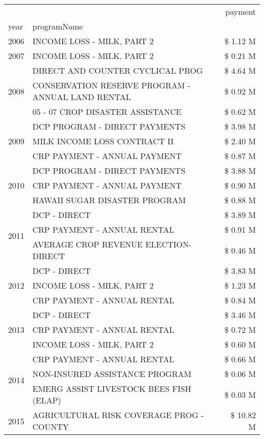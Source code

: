 \begin{tabular}{llr}
\toprule
 &  & payment \\
year & programName &  \\
\midrule
2006 & INCOME LOSS - MILK, PART 2 & \$ 1.12 M \\
\cline{1-3}
2007 & INCOME LOSS - MILK, PART 2 & \$ 0.21 M \\
\cline{1-3}
\multirow[t]{3}{*}{2008} & DIRECT AND COUNTER CYCLICAL PROG & \$ 4.64 M \\
 & CONSERVATION RESERVE PROGRAM - ANNUAL LAND RENTAL & \$ 0.92 M \\
 & 05 - 07 CROP DISASTER ASSISTANCE & \$ 0.62 M \\
\cline{1-3}
\multirow[t]{3}{*}{2009} & DCP PROGRAM - DIRECT PAYMENTS & \$ 3.98 M \\
 & MILK INCOME LOSS CONTRACT II & \$ 2.40 M \\
 & CRP PAYMENT - ANNUAL PAYMENT & \$ 0.87 M \\
\cline{1-3}
\multirow[t]{3}{*}{2010} & DCP PROGRAM - DIRECT PAYMENTS & \$ 3.88 M \\
 & CRP PAYMENT - ANNUAL PAYMENT & \$ 0.90 M \\
 & HAWAII SUGAR DISASTER PROGRAM & \$ 0.88 M \\
\cline{1-3}
\multirow[t]{3}{*}{2011} & DCP - DIRECT & \$ 3.89 M \\
 & CRP PAYMENT - ANNUAL RENTAL & \$ 0.91 M \\
 & AVERAGE CROP REVENUE ELECTION-DIRECT & \$ 0.46 M \\
\cline{1-3}
\multirow[t]{3}{*}{2012} & DCP - DIRECT & \$ 3.83 M \\
 & INCOME LOSS - MILK, PART 2 & \$ 1.23 M \\
 & CRP PAYMENT - ANNUAL RENTAL & \$ 0.84 M \\
\cline{1-3}
\multirow[t]{3}{*}{2013} & DCP - DIRECT & \$ 3.46 M \\
 & CRP PAYMENT - ANNUAL RENTAL & \$ 0.72 M \\
 & INCOME LOSS - MILK, PART 2 & \$ 0.60 M \\
\cline{1-3}
\multirow[t]{3}{*}{2014} & CRP PAYMENT - ANNUAL RENTAL & \$ 0.66 M \\
 & NON-INSURED ASSISTANCE PROGRAM & \$ 0.06 M \\
 & EMERG ASSIST LIVESTOCK BEES FISH (ELAP) & \$ 0.03 M \\
\cline{1-3}
\multirow[t]{3}{*}{2015} & AGRICULTURAL RISK COVERAGE PROG - COUNTY & \$ 10.82 M \\

\end{tabular}

